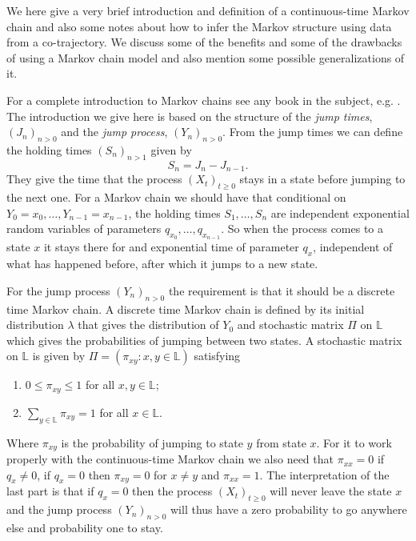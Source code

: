 \documentclass[12pt]{article}
\newcommand{\locset}{\mathbb{L}}
\theoremstyle{definition}
\begin{document}
We here give a very brief introduction and definition of a
continuous-time Markov chain and also some notes about how to infer
the Markov structure using data from a co-trajectory. We discuss some
of the benefits and some of the drawbacks of using a Markov chain
model and also mention some possible generalizations of it.

For a complete introduction to Markov chains see any book in the
subject, e.g. \cite{norris_markov_1997}. The introduction we give here
is based on the structure of the \emph{jump times},
\((J_{n})_{n > 0}\) and the \emph{jump process}, \((Y_{n})_{n > 0}\).
From the jump times we can define the holding times
\((S_{n})_{n > 1}\) given by
\begin{equation*}
  S_{n} = J_{n} - J_{n - 1}.
\end{equation*}
They give the time that the process \((X_{t})_{t \geq 0}\) stays in a
state before jumping to the next one. For a Markov chain we should
have that conditional on \(Y_{0} = x_{0},\dots, Y_{n - 1} = x_{n-1}\),
the holding times \(S_{1},\dots, S_{n}\) are independent exponential
random variables of parameters \(q_{x_{0}},\dots, q_{x_{n-1}}\). So
when the process comes to a state \(x\) it stays there for and
exponential time of parameter \(q_{x}\), independent of what has
happened before, after which it jumps to a new state.

For the jump process \((Y_{n})_{n > 0}\) the requirement is that it
should be a discrete time Markov chain. A discrete time Markov chain
is defined by its initial distribution \(\lambda\) that gives the
distribution of \(Y_{0}\) and stochastic matrix \(\Pi\) on \(\locset\)
which gives the probabilities of jumping between two states. A
stochastic matrix on \(\locset\) is given by
\(\Pi = (\pi_{xy}: x,y \in \locset)\) satisfying
\begin{enumerate}
\item \(0 \leq \pi_{xy} \leq 1\) for all \(x, y \in \locset\);
\item \(\sum_{y \in \locset} \pi_{xy} = 1\) for all \(x \in \locset\).
\end{enumerate}
Where \(\pi_{xy}\) is the probability of jumping to state \(y\) from
state \(x\). For it to work properly with the continuous-time Markov
chain we also need that \(\pi_{xx} = 0\) if \(q_{x} \not= 0\), if
\(q_{x} = 0\) then \(\pi_{xy} = 0\) for \(x \not= y\) and
\(\pi_{xx} = 1\). The interpretation of the last part is that if
\(q_{x} = 0\) then the process \((X_{t})_{t \geq 0}\) will never leave
the state \(x\) and the jump process \((Y_{n})_{n > 0}\) will thus
have a zero probability to go anywhere else and probability one to
stay.
\end{document}

